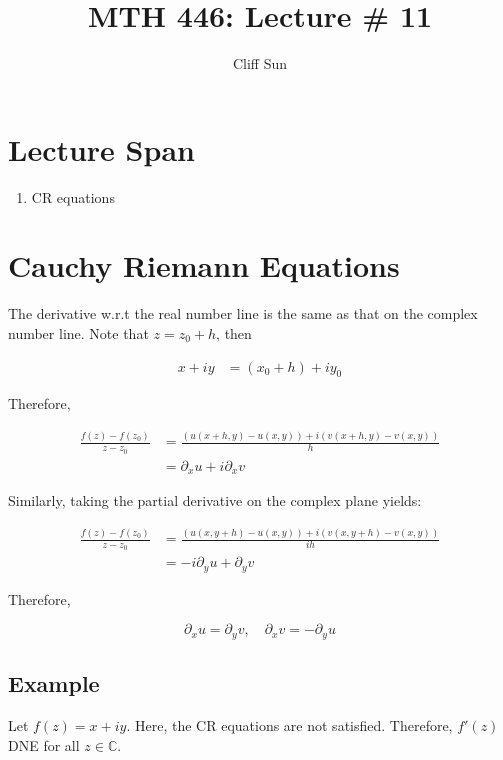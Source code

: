 \documentclass{article}
\title{MTH 446: Lecture \# 11}
\author{Cliff Sun}
\newtheorem{one minute paper}[theorem]{One Minute Paper}
\begin{document}
\maketitle

\section*{Lecture Span}
\begin{enumerate}
    \item CR equations
\end{enumerate}

\section*{Cauchy Riemann Equations}

The derivative w.r.t the real number line is the same as that on the complex number line. Note that $z = z_0 + h$, then 

\begin{align}
    x + iy &= (x_0 + h) + iy_0
\end{align}

Therefore, 

\begin{align}
    \frac{f(z) - f(z_0)}{z - z_0} &= \frac{(u(x + h, y) - u(x,y)) + i(v(x + h, y) - v(x,y))}{h} \\
    &= \partial_x u + i \partial_x v
\end{align}

Similarly, taking the partial derivative on the complex plane yields:

\begin{align}
    \frac{f(z) - f(z_0)}{z - z_0} &= \frac{(u(x, y + h) - u(x,y)) + i(v(x, y + h) - v(x,y))}{ih} \\
    &= -i\partial_y u + \partial_y v
\end{align}

Therefore, 

\begin{equation}
    \partial_x u = \partial_y v, \quad \partial_x v = -\partial_y u
\end{equation}

\subsection*{Example}

Let $f(z) = x + iy$. Here, the CR equations are not satisfied. Therefore, $f'(z)$ DNE for all $z \in \mathbb{C}$. 
\end{document}

